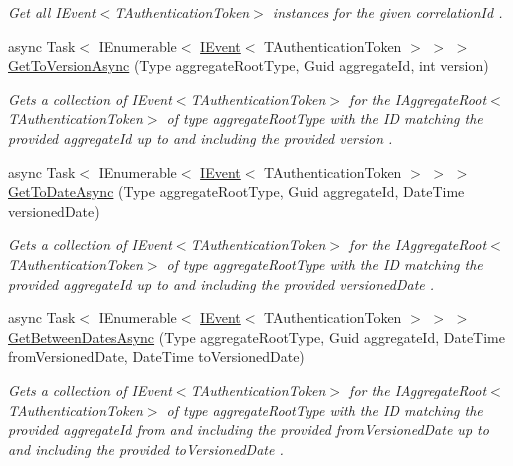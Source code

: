 \begin{DoxyCompactItemize}
\begin{DoxyCompactList}\small\item\em Get all I\+Event$<$\+T\+Authentication\+Token$>$ instances for the given {\itshape correlation\+Id} . \end{DoxyCompactList}\item 
async Task$<$ I\+Enumerable$<$ \hyperlink{interfaceCqrs_1_1Events_1_1IEvent}{I\+Event}$<$ T\+Authentication\+Token $>$ $>$ $>$ \hyperlink{classCqrs_1_1Azure_1_1DocumentDb_1_1Events_1_1AzureDocumentDbEventStore_a1f757002d6a4e02f782feeddbb8d4815_a1f757002d6a4e02f782feeddbb8d4815}{Get\+To\+Version\+Async} (Type aggregate\+Root\+Type, Guid aggregate\+Id, int version)
\begin{DoxyCompactList}\small\item\em Gets a collection of I\+Event$<$\+T\+Authentication\+Token$>$ for the I\+Aggregate\+Root$<$\+T\+Authentication\+Token$>$ of type {\itshape aggregate\+Root\+Type}  with the ID matching the provided {\itshape aggregate\+Id}  up to and including the provided {\itshape version} . \end{DoxyCompactList}\item 
async Task$<$ I\+Enumerable$<$ \hyperlink{interfaceCqrs_1_1Events_1_1IEvent}{I\+Event}$<$ T\+Authentication\+Token $>$ $>$ $>$ \hyperlink{classCqrs_1_1Azure_1_1DocumentDb_1_1Events_1_1AzureDocumentDbEventStore_a64e7a2f4bd301c8c0ae133bb1aeb6758_a64e7a2f4bd301c8c0ae133bb1aeb6758}{Get\+To\+Date\+Async} (Type aggregate\+Root\+Type, Guid aggregate\+Id, Date\+Time versioned\+Date)
\begin{DoxyCompactList}\small\item\em Gets a collection of I\+Event$<$\+T\+Authentication\+Token$>$ for the I\+Aggregate\+Root$<$\+T\+Authentication\+Token$>$ of type {\itshape aggregate\+Root\+Type}  with the ID matching the provided {\itshape aggregate\+Id}  up to and including the provided {\itshape versioned\+Date} . \end{DoxyCompactList}\item 
async Task$<$ I\+Enumerable$<$ \hyperlink{interfaceCqrs_1_1Events_1_1IEvent}{I\+Event}$<$ T\+Authentication\+Token $>$ $>$ $>$ \hyperlink{classCqrs_1_1Azure_1_1DocumentDb_1_1Events_1_1AzureDocumentDbEventStore_a79c4e82a86c78b074263ec65e4213a21_a79c4e82a86c78b074263ec65e4213a21}{Get\+Between\+Dates\+Async} (Type aggregate\+Root\+Type, Guid aggregate\+Id, Date\+Time from\+Versioned\+Date, Date\+Time to\+Versioned\+Date)
\begin{DoxyCompactList}\small\item\em Gets a collection of I\+Event$<$\+T\+Authentication\+Token$>$ for the I\+Aggregate\+Root$<$\+T\+Authentication\+Token$>$ of type {\itshape aggregate\+Root\+Type}  with the ID matching the provided {\itshape aggregate\+Id}  from and including the provided {\itshape from\+Versioned\+Date}  up to and including the provided {\itshape to\+Versioned\+Date} . \end{DoxyCompactList}\end{DoxyCompactItemize}
